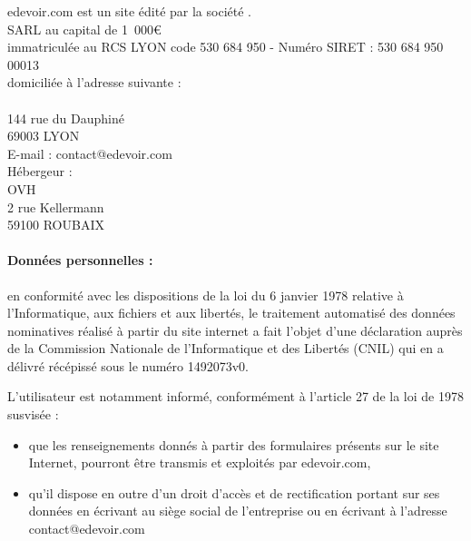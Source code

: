 edevoir.com est un site édité par la société \eDevoir.\\

SARL \eDevoir au capital de 1~000\euro\\
immatriculée au RCS LYON code 530 684 950 - Numéro SIRET : 530 684 950 00013\\

domiciliée à l'adresse suivante :\\
\eDevoir\\
144 rue du Dauphiné\\
69003 LYON\\
E-mail : contact@edevoir.com\\

Hébergeur :\\
OVH\\
2 rue Kellermann\\
59100 ROUBAIX

\paragraph*{Données personnelles :}
en conformité avec les dispositions de la loi du 6 janvier 1978 relative à l'Informatique, aux fichiers et aux libertés, le traitement automatisé des données nominatives réalisé à partir du site internet a fait l'objet d'une déclaration auprès de la Commission Nationale de l'Informatique et des Libertés (CNIL) qui en a délivré récépissé sous le numéro 1492073v0.

L'utilisateur est notamment informé, conformément à l'article 27 de la loi de 1978 susvisée :
\begin{itemize}
   \item que les renseignements donnés à partir des formulaires présents sur le site Internet, pourront être transmis et exploités par edevoir.com,
   \item qu'il dispose en outre d'un droit d'accès et de rectification portant sur ses données en écrivant au siège social de l'entreprise ou en écrivant à l'adresse contact@edevoir.com
\end{itemize}
